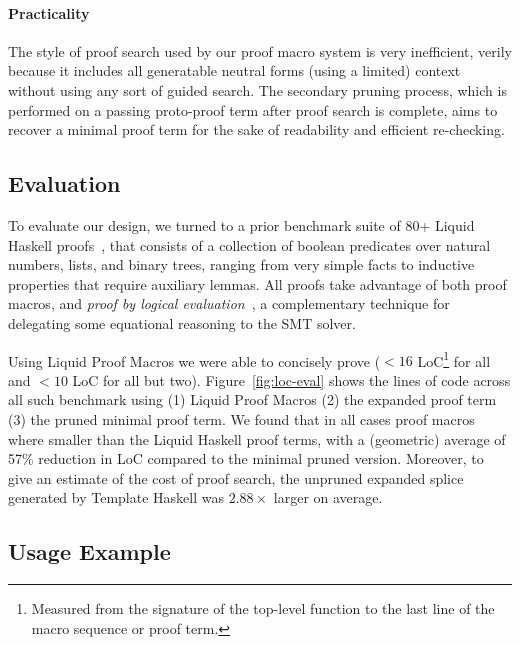 \paragraph{Practicality}
%
The style of proof search used by our proof macro system is very
inefficient, verily because it includes all generatable neutral forms
(using a limited) context without using any sort of guided search. The
secondary pruning process, which is performed on a passing proto-proof
term after proof search is complete, aims to recover a minimal proof
term for the sake of readability and efficient re-checking.

\subsection{Evaluation}
\label{sec:eval-eval}

To evaluate our design, we turned to a prior benchmark suite of 80+
Liquid Haskell proofs~\cite{TacticThesis}, that consists of a
collection of boolean predicates over natural numbers, lists, and
binary trees, ranging from very simple facts to inductive properties
that require auxiliary lemmas. All proofs take advantage of both proof
macros, and {\em proof by logical evaluation}~\cite{VazouTCSNWJ18}, a
complementary technique for delegating some equational reasoning to
the SMT solver.

Using Liquid Proof Macros we were able to concisely prove ($<16$
LoC\footnote{Measured from the signature of the top-level function to the last
line of the macro sequence or proof term.} for all and $<10$ LoC for all but
two). Figure~\ref{fig:loc-eval} shows the lines of code across all such
benchmark using (1) Liquid Proof Macros (2) the expanded proof term (3) the
pruned minimal proof term. We found that in all cases proof macros where smaller
than the Liquid Haskell proof terms, with a (geometric) average of 57\%
reduction in LoC compared to the minimal pruned version. Moreover, to give an
estimate of the cost of proof search, the unpruned expanded splice generated by
Template Haskell was $2.88\times$ larger on average.

\subsection{Usage Example}
\label{sec:example}


